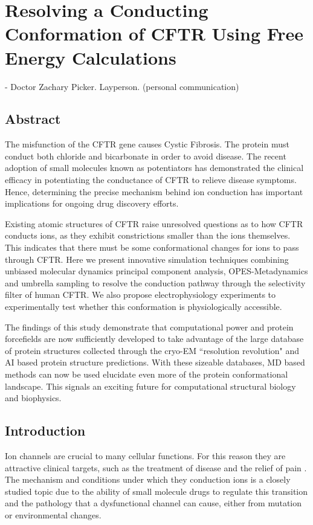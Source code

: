 \chapter{Resolving a Conducting Conformation of CFTR Using Free Energy Calculations}
\label{chap:opening}
 {- Doctor Zachary Picker. Layperson. (personal communication)}
\setcounter{figure}{0}
\renewcommand{\thefigure}{\arabic{chapter}.\arabic{figure}}


\section*{\centering Abstract} 
The misfunction of the CFTR gene causes Cystic Fibrosis. The protein must conduct both chloride and bicarbonate in order to avoid disease. The recent adoption of small molecules known as potentiators has demonstrated the clinical efficacy in potentiating the conductance of CFTR to relieve disease symptoms. Hence, determining the precise mechanism behind ion conduction has important implications for ongoing drug discovery efforts.

Existing atomic structures of CFTR raise unresolved questions as to how CFTR conducts ions, as they exhibit constrictions smaller than the ions themselves. This indicates that there must be some conformational changes for ions to pass through CFTR. Here we present innovative simulation techniques combining unbiased molecular dynamics principal component analysis, OPES-Metadynamics and umbrella sampling to resolve the conduction pathway through the selectivity filter of human CFTR. We also propose electrophysiology experiments to experimentally test whether this conformation is physiologically accessible.  

The findings of this study demonstrate that computational power and protein forcefields are now sufficiently developed to take advantage of the large database of protein structures collected through the cryo-EM ``resolution revolution" and AI based protein structure predictions. With these sizeable databases, MD based methods can now be used elucidate even more of the protein conformational landscape. This signals an exciting future for computational structural biology and biophysics.


\section{Introduction}

Ion channels are crucial to many cellular functions. For this reason they are attractive clinical targets, such as the treatment of disease and the relief of pain \cite{}. The mechanism and conditions under which they conduction ions is a closely studied topic due to the ability of small molecule drugs to regulate this transition and the pathology that a dysfunctional channel can cause, either from mutation or environmental changes.

